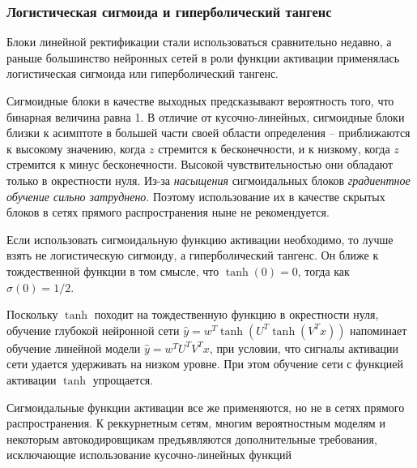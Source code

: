 \documentclass[%
	11pt,
	a4paper,
	utf8,
]{article}
\begin{document}
\subsubsection{Логистическая сигмоида и гиперболический тангенс}

Блоки линейной ректификации стали использоваться сравнительно недавно, а раньше большинство нейронных сетей в роли функции активации применялась логистическая сигмоида или гиперболический тангенс.

Сигмоидные блоки в качестве выходных предсказывают вероятность того, что бинарная величина равна 1. В отличие от кусочно-линейных, сигмоидные блоки близки к асимптоте в большей части своей области определения -- приближаются к высокому значению, когда $ z $ стремится к бесконечности, и к низкому, когда $ z $ стремится к минус бесконечности. Высокой чувствительностью они обладают только в окрестности нуля. Из-за \emph{насыщения} сигмоидальных блоков \emph{градиентное обучение сильно затруднено}. Поэтому использование их в качестве скрытых блоков в сетях прямого распространения ныне не рекомендуется. 

Если использовать сигмоидальную функцию активации необходимо, то лучше взять не логистическую сигмоиду, а гиперболический тангенс. Он ближе к тождественной функции в том смысле, что $ \tanh(0) = 0 $, тогда как $ \sigma(0) = 1/2 $.

Поскольку $ \tanh $ походит на тождественную функцию в окрестности нуля, обучение глубокой нейронной сети $ \hat{y} = w^T \tanh (U^T \tanh (V^T x)) $ напоминает обучение линейной модели $ \hat{y} = w^T U^T V^T x $, при условии, что сигналы активации сети удается удерживать на низком уровне. При этом обучение сети с функцией активации $ \tanh $ упрощается.

Сигмоидальные функции активации все же применяются, но не в сетях прямого распространения. К реккурнетным сетям, многим вероятностным моделям и некоторым автокодировщикам предъявляются дополнительные требования, исключающие использование кусочно-линейных функций









\begin{thebibliography}{99}
	
\end{thebibliography}


\end{document}

